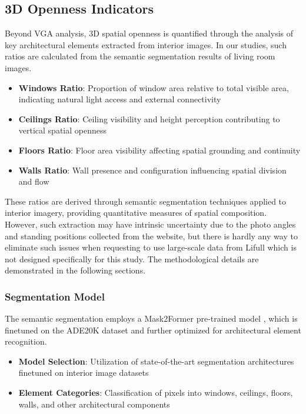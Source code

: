 \subsection{3D Openness Indicators}

Beyond VGA analysis, 3D spatial openness is quantified through the analysis of key architectural elements extracted from 
interior images. In our studies, such ratios are calculated from the semantic segmentation results of living room images.

\begin{itemize}
    \item \textbf{Windows Ratio}: Proportion of window area relative to total visible area, indicating natural light 
    access and external connectivity
    \item \textbf{Ceilings Ratio}: Ceiling visibility and height perception contributing to vertical spatial openness
    \item \textbf{Floors Ratio}: Floor area visibility affecting spatial grounding and continuity
    \item \textbf{Walls Ratio}: Wall presence and configuration influencing spatial division and flow
\end{itemize}

These ratios are derived through semantic segmentation techniques applied to interior imagery, providing quantitative 
measures of spatial composition. However, such extraction may have intrinsic uncertainty due to the photo angles and 
standing positions collected from the website, but there is hardly any way to eliminate such issues when requesting 
to use large-scale data from Lifull which is not designed specifically for this study. The methodological details are 
demonstrated in the following sections.

\subsubsection{Segmentation Model}

The semantic segmentation employs a Mask2Former pre-trained model \cite{cheng2022masked}, which is finetuned on the ADE20K dataset \cite{zhou2017scene}
and further optimized for architectural element recognition.

\begin{itemize}
    \item \textbf{Model Selection}: Utilization of state-of-the-art segmentation architectures finetuned on 
    interior image datasets
    \item \textbf{Element Categories}: Classification of pixels into windows, ceilings, floors, walls, and other 
    architectural components
\end{itemize}

